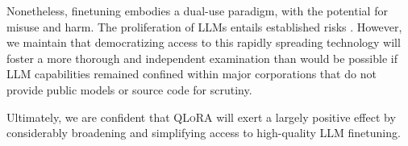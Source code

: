Nonetheless, finetuning embodies a dual-use paradigm, with the potential for misuse and harm. The proliferation of LLMs entails established risks \citep{bommasani2021opportunities,bender2021dangers}. However, we maintain that democratizing access to this rapidly spreading technology will foster a more thorough and independent examination than would be possible if LLM capabilities remained confined within major corporations that do not provide public models or source code for scrutiny.

Ultimately, we are confident that \textsc{QLoRA} will exert a largely positive effect by considerably broadening and simplifying access to high-quality LLM finetuning.